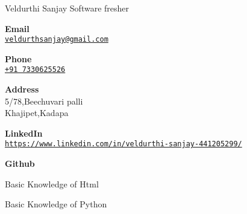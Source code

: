 \documentclass{article}
\begin{document}
\begin{cv}{Veldurthi Sanjay }{Software fresher}
\begin{cvevent}
\end{cvevent}
\begin{cvevent}
\end{cvevent}



\cvsidebar %



\begin{cvitem}[Envelope][4]
    \textbf{Email}\\
    \href{mailto:veldurthsanjay@gmail.com}{\texttt{veldurthsanjay@gmail.com}}
\end{cvitem}

\cvseparator[3]
\begin{cvitem}[Phone][4]
    \textbf{Phone}\\
    \href{tel:7330625526}{\texttt{+91 7330625526}}
\end{cvitem}

\cvseparator[3]
\begin{cvitem}[Home][4]
    \textbf{Address}\\
    5/78,Beechuvari palli\\ Khajipet,Kadapa
\end{cvitem}

\cvseparator[3]
\begin{cvitem}[Globe][4]
    \textbf{LinkedIn}\\
    \href{https://www.linkedin.com/in/veldurthi-sanjay-441205299/}{\texttt{https://www.linkedin.com/in/veldurthi-sanjay-441205299/}}
\end{cvitem}

\cvseparator[3]
\begin{cvitem}[Globe][4]
   \textbf{Github}\\
    \href{https://github.com/veldurthsanjay}{}
\end{cvitem}



\begin{cvitem}
    Basic Knowledge of Html
\end{cvitem}

\cvseparator
\begin{cvitem}
    Basic Knowledge of Python
\end{cvitem}


\end{cv}
\end{document}
